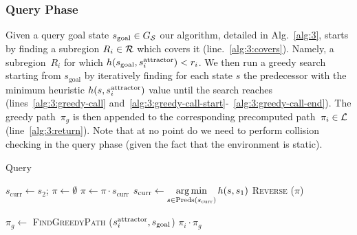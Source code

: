 \documentclass[a4paper,10pt]{article}
\begin{document}
\subsubsection{Query Phase}
Given a query goal state $s_{\text{goal}} \in G_\mathcal{S}$ 
our algorithm, detailed in Alg.~\ref{alg:3}, starts by finding a subregion $R_i \in \mathcal{R}$ which covers it (line.~\ref{alg:3:covers}). Namely, a subregion~$R_i$ for which 
$h(s_{\text{goal}}, s^{\text{attractor}}_i) < r_i$.
We then run a greedy search starting from $s_{\text{goal}}$ by iteratively finding for each state $s$ the predecessor with the minimum heuristic $h(s, s^{\text{attractor}}_i)$ value until the search reaches \sAttract (lines~\ref{alg:3:greedy-call} and~\ref{alg:3:greedy-call-start}-~\ref{alg:3:greedy-call-end}). 
The greedy path~$\pi_g$ is then appended to the corresponding precomputed path~$\pi_i \in \mathcal{L}$ (line~\ref{alg:3:return}). 
Note that at no point  do we need to perform collision checking in the query phase (given the fact that the environment is static).

\begin{algorithm}[t]
\footnotesize
\caption{Query}\label{alg:3}

\begin{algorithmic}[1]
  \label{alg:3:greedy-call-start}
  \State $s_{\text{curr}} \leftarrow s_2$; \hspace{2mm} $\pi \leftarrow \emptyset$
    \State $\pi \leftarrow \pi \cdot s_{\text{curr}}$
      \State $s_{\text{curr}} \leftarrow \operatorname*{arg\,min}\limits_{s \in \text{Preds}(s_{\text{curr}})} h(s, s_1)$  
    \EndWhile
    \State \Return \textsc{Reverse} ($\pi$)   
\EndProcedure
\label{alg:3:greedy-call-end}

\vspace{2mm}

    \label{alg:3:covers}
      \State $\pi_g \leftarrow$ \textsc{FindGreedyPath} ($s^{\text{attractor}}_i, s_{\text{goal}}$)
      \label{alg:3:greedy-call}
      \State \Return $\pi_i \cdot \pi_g$  
      \label{alg:3:return}
    \EndIf
  \EndFor

\EndProcedure
\end{algorithmic}
\end{algorithm}
\end{document}
